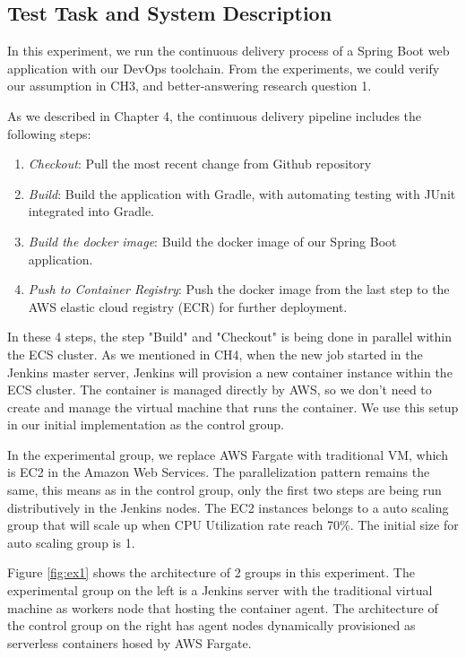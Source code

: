 \subsection{Test Task and System Description}
In this experiment, we run the continuous delivery process of a Spring Boot web application with our DevOps toolchain. From the experiments, we could verify our assumption in CH3, and better-answering research question 1.
\par
As we described in Chapter 4, the continuous delivery pipeline includes the following steps:
\begin{enumerate}
    \item \textit{Checkout}: Pull the most recent change from Github repository
    \item \textit{Build}: Build the application with Gradle, with automating testing with JUnit integrated into Gradle.
    \item \textit{Build the docker image}: Build the docker image of our Spring Boot application.
    \item \textit{Push to Container Registry}: Push the docker image from the last step to the AWS elastic cloud registry (ECR) for further deployment.
\end{enumerate}
\par
In these 4 steps, the step "Build" and "Checkout" is being done in parallel within the ECS cluster. As we mentioned in CH4, when the new job started in the Jenkins master server, Jenkins will provision a new container instance within the ECS cluster. The container is managed directly by AWS, so we don't need to create and manage the virtual machine that runs the container. We use this setup in our initial implementation as the control group.
\par
In the experimental group, we replace AWS Fargate with traditional VM, which is EC2 in the Amazon Web Services. The parallelization pattern remains the same, this means as in the control group, only the first two steps are being run distributively in the Jenkins nodes. The EC2 instances belongs to a auto scaling group that will scale up when CPU Utilization rate reach 70\%. The initial size for auto scaling group is 1.
\par
Figure \ref{fig:ex1} shows the architecture of 2 groups in this experiment. The experimental group on the left is a Jenkins server with the traditional virtual machine as workers node that hosting the container agent. The architecture of the control group on the right has agent nodes dynamically provisioned as serverless containers hosed by AWS Fargate.
